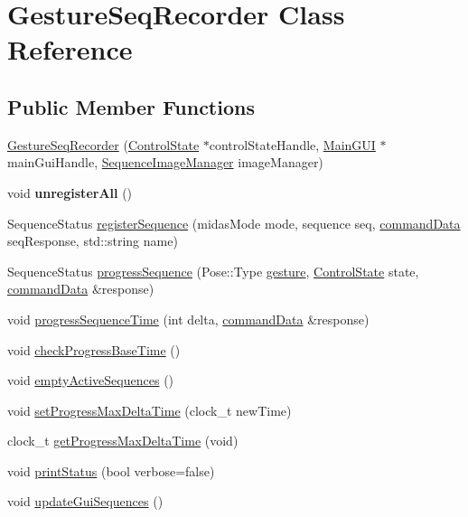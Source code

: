 \hypertarget{class_gesture_seq_recorder}{\section{Gesture\+Seq\+Recorder Class Reference}
\label{class_gesture_seq_recorder}
}
\subsection*{Public Member Functions}
\begin{DoxyCompactItemize}
\item 
\hyperlink{class_gesture_seq_recorder_a89617ae8b04c44b33006f14c388ed248}{Gesture\+Seq\+Recorder} (\hyperlink{class_control_state}{Control\+State} $\ast$control\+State\+Handle, \hyperlink{class_main_g_u_i}{Main\+G\+U\+I} $\ast$main\+Gui\+Handle, \hyperlink{class_sequence_image_manager}{Sequence\+Image\+Manager} image\+Manager)
\item 
\hypertarget{class_gesture_seq_recorder_a3aab363a46e6c19c494de8572c039577}{void {\bfseries unregister\+All} ()}\label{class_gesture_seq_recorder_a3aab363a46e6c19c494de8572c039577}

\item 
Sequence\+Status \hyperlink{class_gesture_seq_recorder_a5a2febae745433a770227ab6bdeb7630}{register\+Sequence} (midas\+Mode mode, sequence seq, \hyperlink{structcommand_data}{command\+Data} seq\+Response, std\+::string name)
\item 
Sequence\+Status \hyperlink{class_gesture_seq_recorder_aa64d6f130b1937fea36a8d6aa4362c6b}{progress\+Sequence} (Pose\+::\+Type \hyperlink{structgesture}{gesture}, \hyperlink{class_control_state}{Control\+State} state, \hyperlink{structcommand_data}{command\+Data} \&response)
\item 
void \hyperlink{class_gesture_seq_recorder_ad67f5a6b8d22d6895b42e4ec47be3562}{progress\+Sequence\+Time} (int delta, \hyperlink{structcommand_data}{command\+Data} \&response)
\item 
void \hyperlink{class_gesture_seq_recorder_a32b78602089532a166879ed9a27fac2e}{check\+Progress\+Base\+Time} ()
\item 
void \hyperlink{class_gesture_seq_recorder_a0692d367b4429900c3ab05dfa36990fa}{empty\+Active\+Sequences} ()
\item 
void \hyperlink{class_gesture_seq_recorder_a0a5fd083e4e0ed75d6f07415a6e5cea1}{set\+Progress\+Max\+Delta\+Time} (clock\+\_\+t new\+Time)
\item 
clock\+\_\+t \hyperlink{class_gesture_seq_recorder_aa5de7ea6101ab22ba2a14f0f718a6370}{get\+Progress\+Max\+Delta\+Time} (void)
\item 
void \hyperlink{class_gesture_seq_recorder_a65164a6763e30c37677cefe5aff5a36b}{print\+Status} (bool verbose=false)
\item 
void \hyperlink{class_gesture_seq_recorder_ad27d85ae4783eda851c692ffb542efdb}{update\+Gui\+Sequences} ()
\end{DoxyCompactItemize}



